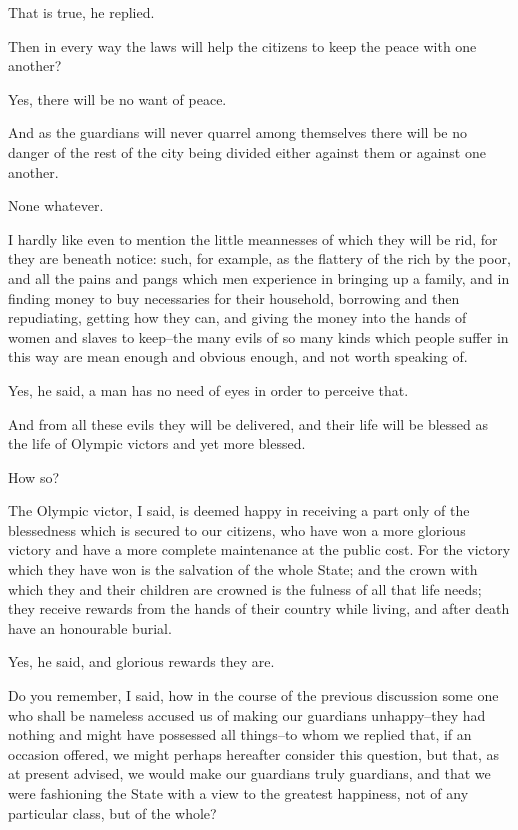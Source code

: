 That is true, he replied.

Then in every way the laws will help the citizens to keep the peace with
one another?

Yes, there will be no want of peace.

And as the guardians will never quarrel among themselves there will be
no danger of the rest of the city being divided either against them or
against one another.

None whatever.

I hardly like even to mention the little meannesses of which they will
be rid, for they are beneath notice: such, for example, as the
flattery of the rich by the poor, and all the pains and pangs which
men experience in bringing up a family, and in finding money to buy
necessaries for their household, borrowing and then repudiating, getting
how they can, and giving the money into the hands of women and slaves
to keep--the many evils of so many kinds which people suffer in this way
are mean enough and obvious enough, and not worth speaking of.

Yes, he said, a man has no need of eyes in order to perceive that.

And from all these evils they will be delivered, and their life will be
blessed as the life of Olympic victors and yet more blessed.

How so?

The Olympic victor, I said, is deemed happy in receiving a part only of
the blessedness which is secured to our citizens, who have won a more
glorious victory and have a more complete maintenance at the public
cost. For the victory which they have won is the salvation of the whole
State; and the crown with which they and their children are crowned is
the fulness of all that life needs; they receive rewards from the
hands of their country while living, and after death have an honourable
burial.

Yes, he said, and glorious rewards they are.

Do you remember, I said, how in the course of the previous discussion
some one who shall be nameless accused us of making our guardians
unhappy--they had nothing and might have possessed all things--to whom
we replied that, if an occasion offered, we might perhaps hereafter
consider this question, but that, as at present advised, we would make
our guardians truly guardians, and that we were fashioning the State
with a view to the greatest happiness, not of any particular class, but
of the whole?

